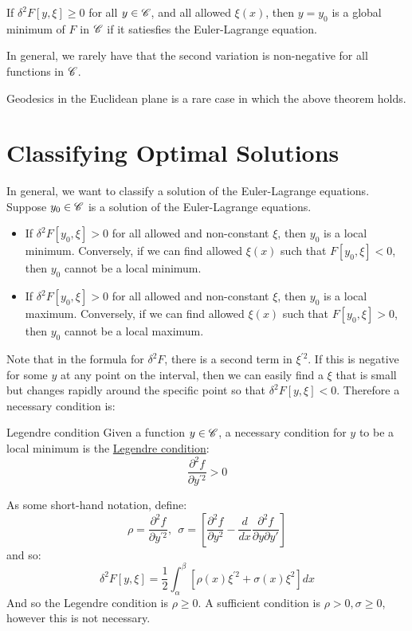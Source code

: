 \documentclass[../Main.tex]{subfiles}
\begin{document}
\begin{theorem}
    If $\delta^2 F[y, \xi] \geq 0$ for all $y \in \mathscr{C}$, and all allowed $\xi(x)$, then $y = y_0$ is a global minimum of $F$ in $\mathscr{C}$ if it satiesfies the Euler-Lagrange equation.
\end{theorem}
\begin{remark}
    In general, we rarely have that the second variation is non-negative for all functions in $\mathscr{C}$.
\end{remark}
\begin{example}
    Geodesics in the Euclidean plane is a rare case in which the above theorem holds.
\end{example}
\section{Classifying Optimal Solutions}
In general, we want to classify a solution of the Euler-Lagrange equations. Suppose $y_0 \in \mathscr{C}$ is a solution of the Euler-Lagrange equations.
\begin{itemize}
    \item If $\delta^2 F[y_0, \xi] > 0$ for all allowed and non-constant $\xi$, then $y_0$ is a local minimum. Conversely, if we can find allowed $\xi(x)$ such that $F[y_0, \xi] < 0$, then $y_0$ cannot be a local minimum.
    \item If $\delta^2 F[y_0, \xi] > 0$ for all allowed and non-constant $\xi$, then $y_0$ is a local maximum. Conversely, if we can find allowed $\xi(x)$ such that $F[y_0, \xi] > 0$, then $y_0$ cannot be a local maximum.
\end{itemize}
Note that in the formula for $\delta^2 F$, there is a second term in $\xi^{\prime 2}$. If this is negative for some $y$ at any point on the interval, then we can easily find a $\xi$ that is small but changes rapidly around the specific point so that $\delta^2 F[y, \xi] < 0$. Therefore a necessary condition is:
\begin{definition}{Legendre condition}
    Given a function $y \in \mathscr{C}$, a necessary condition for $y$ to be a local minimum is the \underline{Legendre condition}:
    \begin{equation*}
        \frac{\partial^2 f}{\partial y^{\prime 2}} > 0
    \end{equation*}
\end{definition}
As some short-hand notation, define:
\begin{equation*}
    \rho = \frac{\partial^2 f}{\partial y^{\prime 2}},~~\sigma = \left[\frac{\partial^2 f}{\partial y^2} - \frac{d}{dx} \frac{\partial^2f}{\partial y \partial y'}\right]
\end{equation*}
and so:
\begin{equation*}
    \delta^2 F[y, \xi] = \frac{1}{2} \int_\alpha^\beta \left[\rho(x) \xi^{\prime 2} + \sigma(x) \xi^2\right]dx
\end{equation*}
And so the Legendre condition is $\rho \geq 0$. A sufficient condition is $\rho > 0, \sigma \geq 0$, however this is not necessary.
\end{document}
